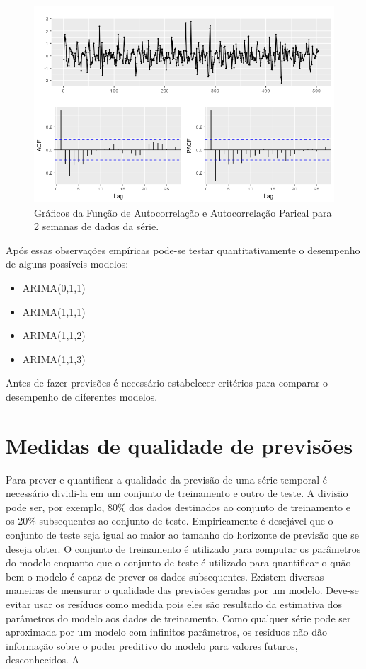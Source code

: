 \documentclass[
	12pt,				%
	openright,			%
	oneside,			%
	a4paper,			%
	english,			%
	french,				%
	spanish,			%
	brazil				%
	]{abntex2}
\begin{document}
\begin{figure}[h]
    \centering
	\includegraphics[width=\textwidth]{last3weeks_acf.png}
	\caption{Gráficos da Função de Autocorrelação e Autocorrelação Parical para 2 semanas de dados da série.}
\end{figure}
\FloatBarrier 

Após essas observações empíricas pode-se testar quantitativamente o desempenho de alguns possíveis modelos:

\begin{itemize}
	\item ARIMA(0,1,1)
	\item ARIMA(1,1,1)
	\item ARIMA(1,1,2)
	\item ARIMA(1,1,3)
\end{itemize}

Antes de fazer previsões é necessário estabelecer critérios para comparar o desempenho de diferentes modelos.

\section{Medidas de qualidade de previsões}\label{erro}

Para prever e quantificar a qualidade da previsão de uma série temporal é necessário dividi-la em um conjunto de treinamento e outro de teste. A divisão pode ser, por exemplo, 80\% dos dados destinados ao conjunto de treinamento e os 20\% subsequentes ao conjunto de teste. Empiricamente é desejável que o conjunto de teste seja igual ao maior ao tamanho do horizonte de previsão que se deseja obter. O conjunto de treinamento é utilizado para computar os parâmetros do modelo enquanto que o conjunto de teste é utilizado para quantificar o quão bem o modelo é capaz de prever os dados subsequentes.
Existem diversas maneiras de mensurar o qualidade das previsões geradas por um modelo. Deve-se evitar usar os resíduos como medida pois eles são resultado da estimativa dos parâmetros do modelo aos dados de treinamento. Como qualquer série pode ser aproximada por um modelo com infinitos parâmetros, os resíduos não dão informação sobre o poder preditivo do modelo para valores futuros, desconhecidos. A
\end{document}
